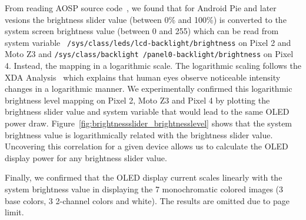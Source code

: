 From reading AOSP source code~\cite{sourcecode:brightness1,sourcecode:brightness2},
we found that for Android Pie and later vesions %
the brightness slider value (between 0\% and 100\%) is 
converted to the system screen brightness value (between 0 and 255)
which can be read from system variable {\small \tt
  /sys/class/leds/lcd-backlight/brightness} on Pixel 2 and Moto Z3
and {{\small \tt /sys/class/backlight
    /panel0-backlight/brightness} on Pixel 4}.  Instead, the mapping
in a logarithmic scale.  The logarithmic scaling follows the XDA
Analysis~\cite{brightness2019} which explains that human eyes observe
noticeable intensity changes in a logarithmic manner.
%
We experimentally confirmed this logarithmic brightness level mapping on Pixel 2,
Moto Z3 and Pixel 4 by plotting the brightness slider value and 
system variable that would lead to the same OLED power draw.
Figure~\ref{fig:brightnessslider_brightnesslevel} shows that
the system brightness value is logarithmically related
with the brightness slider value.
%
Uncovering this correlation for a given device allows us to calculate
the OLED display power for any brightness slider value.

Finally, we confirmed that
the OLED display current scales linearly with
the system brightness value
in displaying
the 7 monochromatic colored images (3 base colors, 3 2-channel colors and white).
The results are omitted due to page limit.
\fi

